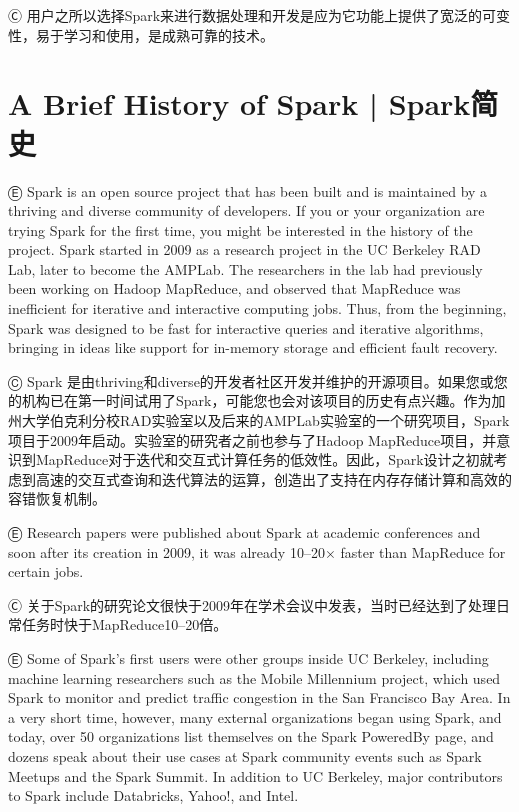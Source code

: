 Ⓒ 用户之所以选择Spark来进行数据处理和开发是应为它功能上提供了宽泛的可变性，易于学习和使用，是成熟可靠的技术。

\section{A Brief History of Spark  |  Spark简史}\label{a-brief-history-of-spark}

Ⓔ \textcolor{etc}{Spark is an open source project that has been built and is maintained by a thriving and diverse community of developers. If you or your organization are trying Spark for the first time, you might be interested in the history of the project. Spark started in 2009 as a research project in the UC Berkeley RAD Lab, later to become the AMPLab. The researchers in the lab had previously been working on Hadoop MapReduce, and observed that MapReduce was inefficient for iterative and interactive computing jobs. Thus, from the beginning, Spark was designed to be fast for interactive queries and iterative algorithms, bringing in ideas like support for in-memory storage and efficient fault recovery.}

Ⓒ Spark 是由thriving和diverse的开发者社区开发并维护的开源项目。如果您或您的机构已在第一时间试用了Spark，可能您也会对该项目的历史有点兴趣。作为加州大学伯克利分校RAD实验室以及后来的AMPLab实验室的一个研究项目，Spark项目于2009年启动。实验室的研究者之前也参与了Hadoop MapReduce项目，并意识到MapReduce对于迭代和交互式计算任务的低效性。因此，Spark设计之初就考虑到高速的交互式查询和迭代算法的运算，创造出了支持在内存存储计算和高效的容错恢复机制。

Ⓔ \textcolor{etc}{Research papers were published about Spark at academic conferences and soon after its creation in 2009, it was already 10--20$\times$ faster than MapReduce for certain jobs.}

Ⓒ 关于Spark的研究论文很快于2009年在学术会议中发表，当时已经达到了处理日常任务时快于MapReduce10--20倍。

Ⓔ \textcolor{etc}{Some of Spark's first users were other groups inside UC Berkeley, including machine learning researchers such as the Mobile Millennium project, which used Spark to monitor and predict traffic congestion in the San Francisco Bay Area. In a very short time, however, many external organizations began using Spark, and today, over 50 organizations list themselves on the Spark PoweredBy page, and dozens speak about their use cases at Spark community events such as Spark Meetups and the Spark Summit. In addition to UC Berkeley, major contributors to Spark include Databricks, Yahoo!, and Intel.}

